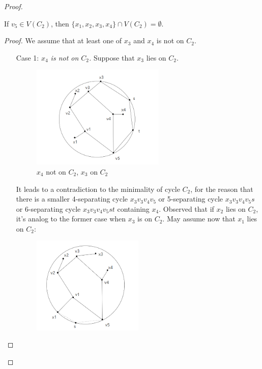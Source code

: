 \begin{proof}
\begin{itemize}
\begin{lemma}
If $v_5 \in V(C_2)$, then $\{x_1, x_2, x_3, x_4\} \cap V(C_2) = \emptyset$.
\end{lemma}
\begin{proof}
We assume that at least one of $x_3$ and $x_4$ is not on $C_2$.
\begin{itemize}
    \item[Case 1:] \textit{\textit{$x_4$ is not on $C_2$.}} Suppose that $x_3$ lies on $C_2$. \begin{figure}[H] %
    \centering %
    \includegraphics[width=0.6\textwidth]{figure/x4notonc2.png} 
    \caption{$x_4$ not on $C_2$, $x_3$ on $C_2$} %
    \label{figure} %
    \end{figure}
    It leads to a contradiction to the minimality of cycle $C_2$, for the reason that there is a smaller 4-separating cycle $x_3v_3v_4v_5$ or 5-separating cycle $x_3v_3v_4v_5s$ or 6-separating cycle $x_3v_3v_4v_5st$ containing $x_4$. Observed that if $x_2$ lies on $C_2$, it's analog to the former case when $x_3$ is on $C_2$. May assume now that $x_1$ lies on $C_2$:
    \begin{figure}[H] %
    \centering %
    \includegraphics[width=0.5\textwidth]{figure/x1notonc2.png} 

\end{figure}
\end{itemize}
\end{proof}
\end{itemize}
\end{proof}
